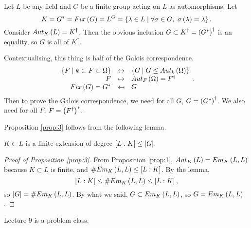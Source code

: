 \begin{proposition}
\label{prop:3}
Let $ L $ be any field and $ G $ be a finite group acting on $ L $ as automorphisms. Let
$$ K = G^* = Fix\left( G \right) = L^G = \left\{ \lambda \in L \mid \forall \sigma \in G, \ \sigma\left( \lambda \right) = \lambda \right\}. $$
Consider $ Aut_K\left( L \right) = K^\dagger $. Then the obvious inclusion $ G \subset K^\dagger = \left( G^* \right)^\dagger $ is an equality, so $ G $ is all of $ K^\dagger $.
\end{proposition}

\begin{remark*}
Contextualising, this thing is half of the Galois correspondence.
$$
\begin{array}{rcl}
\left\{ F \mid k \subset F \subset \Omega \right\} & \leftrightarrow & \left\{ G \mid G \le Aut_k\left( \Omega \right) \right\} \\
F & \mapsto & Aut_F\left( \Omega \right) = F^\dagger \\
Fix\left( G \right) = G^* & \mapsfrom & G
\end{array}.
$$
Then to prove the Galois correspondence, we need for all $ G $, $ G = \left( G^* \right)^\dagger $. We also need for all $ F $, $ F = \left( F^\dagger \right)^* $.
\end{remark*}

Proposition \ref{prop:3} follows from the following lemma.

\begin{lemma}
\label{lem:3}
$ K \subset L $ is a finite extension of degree $ \left[ L : K \right] \le \left\lvert G \right\rvert $.
\end{lemma}

\begin{proof}[Proof of Proposition \ref{prop:3}]
From Proposition \ref{prop:1}, $ Aut_K\left( L \right) = Em_K\left( L, L \right) $ because $ K \subset L $ is finite, and $ \#Em_K\left( L, L \right) \le \left[ L : K \right] $. By the lemma,
$$ \left[ L : K \right] \le \#Em_K\left( L, L \right) \le \left[ L : K \right], $$
so $ \left\lvert G \right\rvert = \#Em_K\left( L, L \right) $. By what we said, $ G \subset Em_K\left( L, L \right) $, so $ G = Em_K\left( L, L \right) $.
\end{proof}


Lecture 9 is a problem class.


